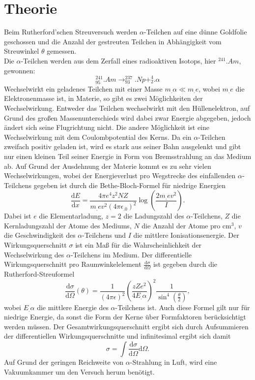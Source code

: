 \section{Theorie}
\label{sec:Theorie}

Beim Rutherford'schen Streuversuch werden $\alpha$-Teilchen auf eine dünne Goldfolie geschossen und die Anzahl der gestreuten Teilchen in Abhängigkeit vom Streuwinkel $\theta$ gemessen.\\
Die $\alpha$-Teilchen werden aus dem Zerfall eines radioaktiven Isotops, hier $^{241}.{Am}$, gewonnen:
\[
^{241}_{95}.{Am}\rightarrow ^{237}_{93}.{Np} + ^{4}_{2}.{\alpha}
\]
Wechselwirkt ein geladenes Teilchen mit einer Masse $m_.{\alpha}\ll m_.e$, wobei $m_.e$ die Elektronenmasse ist, in Materie, so gibt es zwei Möglichkeiten der Wechselwirkung.
Entweder das Teilchen wechselwirkt mit den Hüllenelektron, auf Grund des großen Massenunterschieds wird dabei zwar Energie abgegeben, jedoch ändert sich seine Flugrichtung nicht. Die andere Möglichkeit ist eine Wechselwirkung mit dem Coulombpotential des Kerns. Da ein $\alpha$-Teilchen zweifach positiv geladen ist, wird es stark aus seiner Bahn ausgelenkt und gibt nur einen kleinen Teil seiner Energie in Form von Bremsstrahlung an das Medium ab.
Auf Grund der Ausdehnung der Materie kommt es zu sehr vielen Wechselwirkungen, wobei der Energieverlust pro Wegstrecke des einfallenden $\alpha$-Teilchens gegeben ist durch die Bethe-Bloch-Formel für niedrige Energien
\begin{equation}
\frac{\mathrm{d}E}{\mathrm{d}x}=\frac{4\pi e^4z^2N Z}{m_.ev^2(4\pi\epsilon_.0)^2}\log{\left(\frac{2m_.ev^2}{I}\right)}\text{.}\label{eq:BBF}
\end{equation} 
Dabei ist $e$ die Elementarladung, $z=2$ die Ladungszahl des $\alpha$-Teilchens, $Z$ die Kernladungszahl der Atome des Mediums, $N$ die Anzahl der Atome pro $\si{\centi\meter^3}$, $v$ die Geschwindigkeit des $\alpha$-Teilchens und $I$ die mittlere Ionisationsenergie.
Der Wirkungsquerschnitt $\sigma$ ist ein Maß für die Wahrscheinlichkeit der Wechselwirkung des $\alpha$-Teilchens im Medium.
Der differentielle Wirkungsquerschnitt pro Raumwinkelelement $\frac{\mathrm{d}\sigma}{\mathrm{d}\Omega}$ ist gegeben durch die Rutherford-Streuformel
\begin{equation}
\frac{\mathrm{d}\sigma}{\mathrm{d}\Omega}(\theta)=\frac{1}{(4\pi\epsilon)^2}\left(\frac{z Z e^2}{4 E_.{\alpha}}\right)^2\frac{1}{\sin^4{\left(\frac{\theta}{2}\right)}},\label{eq:RSF}
\end{equation}
wobei $E_.{\alpha}$ die mittlere Energie des $\alpha$-Teilchens ist. Auch diese Formel gilt nur für niedrige Energie, da sonst die Form der Kerne über Formfaktoren berücksichtigt werden müssen.
Der Gesamtwirkungsquerschnitt ergibt sich durch Aufsummieren der differentiellen Wirkungsquerschnitte und infinitesimal ergibt sich damit
\[
\sigma = \int \frac{\mathrm{d}\sigma}{\mathrm{d}\Omega}\mathrm{d}\Omega\text{.}
\]
Auf Grund der geringen Reichweite von $\alpha$-Strahlung in Luft, wird eine Vakuumkammer um den Versuch herum benötigt.







